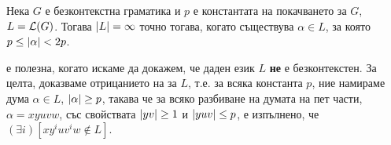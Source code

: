\begin{cor}
  Нека $G$ е безконтекстна граматика и $p$ е константата на покачването за $G$, $L = \mathcal{L}(G)$.
  Тогава $\lvert{L}\rvert = \infty$ точно тогава, когато съществува $\alpha \in L$, за която $p \leq \lvert{\alpha}\rvert < 2p$.
\end{cor}


\begin{framed}
   е полезна, когато искаме да докажем, че даден език $L$ {\bf не} е безконтекстен.
  За целта, доказваме отрицанието на  за $L$, т.е.
  за всяка константа $p$, ние намираме дума $\alpha \in L$, $\lvert{\alpha}\rvert\geq p$, такава че за всяко разбиване на думата на пет части, $\alpha = xyuvw$,
  със свойствата $\lvert{yv}\rvert \geq 1$ и $\lvert{yuv}\rvert \leq p$, е изпълнено, че $(\exists i)[xy^iuv^iw \not\in L]$.
\end{framed}

